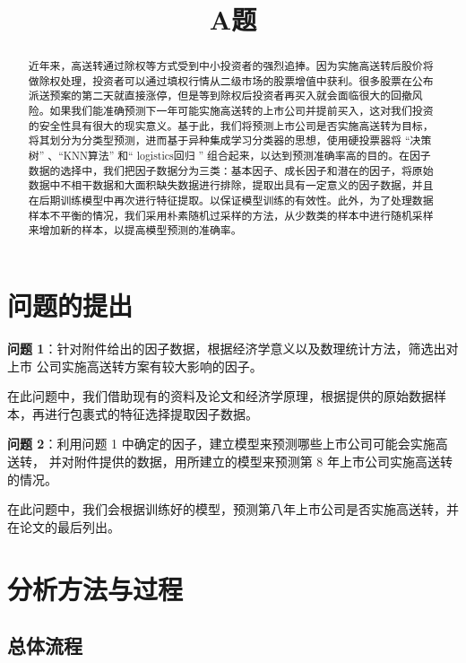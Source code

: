 \documentclass[lang=cn,12pt]{elegantpaper}
\title{A题}
\date{}
\begin{document}
	
\maketitle

\begin{abstract}
\noindent
\large
近年来，高送转通过除权等方式受到中小投资者的强烈追捧。因为实施高送转后股价将做除权处理，投资者可以通过填权行情从二级市场的股票增值中获利。很多股票在公布派送预案的第二天就直接涨停，但是等到除权后投资者再买入就会面临很大的回撤风险。如果我们能准确预测下一年可能实施高送转的上市公司并提前买入，这对我们投资的安全性具有很大的现实意义。基于此，我们将预测上市公司是否实施高送转为目标，将其划分为分类型预测，进而基于异种集成学习分类器的思想，使用硬投票器将  “决策树”  、“KNN算法” 和“ logistics回归 ” 组合起来，以达到预测准确率高的目的。在因子数据的选择中，我们把因子数据分为三类：基本因子、成长因子和潜在的因子，将原始数据中不相干数据和大面积缺失数据进行排除，提取出具有一定意义的因子数据，并且在后期训练模型中再次进行特征提取。以保证模型训练的有效性。此外，为了处理数据样本不平衡的情况，我们采用朴素随机过采样的方法，从少数类的样本中进行随机采样来增加新的样本，以提高模型预测的准确率。
\end{abstract}

\newpage
\tableofcontents
\newpage


\section{问题的提出}
\textbf{问题 1}：针对附件给出的因子数据，根据经济学意义以及数理统计方法，筛选出对上市 公司实施高送转方案有较大影响的因子。

在此问题中，我们借助现有的资料及论文和经济学原理，根据提供的原始数据样本，再进行包裹式的特征选择提取因子数据。

\textbf{问题 2}：利用问题 1 中确定的因子，建立模型来预测哪些上市公司可能会实施高送转， 并对附件提供的数据，用所建立的模型来预测第 8 年上市公司实施高送转的情况。 

在此问题中，我们会根据训练好的模型，预测第八年上市公司是否实施高送转，并在论文的最后列出。

\section{分析方法与过程}

\subsection{总体流程}
\end{document}
